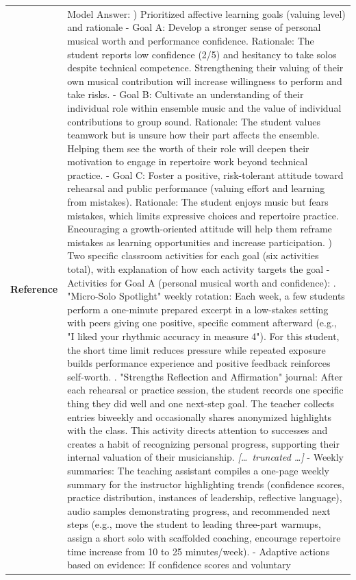 \begin{longtable}{@{}l p{13cm}@{}}
  \textbf{Reference} & Model Answer: \newline 1) Prioritized affective learning goals (valuing level) and rationale \newline - Goal A: Develop a stronger sense of personal musical worth and performance confidence. Rationale: The student reports low confidence (2/5) and hesitancy to take solos despite technical competence. Strengthening their valuing of their own musical contribution will increase willingness to perform and take risks. \newline - Goal B: Cultivate an understanding of their individual role within ensemble music and the value of individual contributions to group sound. Rationale: The student values teamwork but is unsure how their part affects the ensemble. Helping them see the worth of their role will deepen their motivation to engage in repertoire work beyond technical practice. \newline - Goal C: Foster a positive, risk-tolerant attitude toward rehearsal and public performance (valuing effort and learning from mistakes). Rationale: The student enjoys music but fears mistakes, which limits expressive choices and repertoire practice. Encouraging a growth-oriented attitude will help them reframe mistakes as learning opportunities and increase participation. \newline 2) Two specific classroom activities for each goal (six activities total), with explanation of how each activity targets the goal \newline - Activities for Goal A (personal musical worth and confidence): \newline 1. "Micro-Solo Spotlight" weekly rotation: Each week, a few students perform a one-minute prepared excerpt in a low-stakes setting with peers giving one positive, specific comment afterward (e.g., "I liked your rhythmic accuracy in measure 4"). For this student, the short time limit reduces pressure while repeated exposure builds performance experience and positive feedback reinforces self-worth. \newline 2. "Strengths Reflection and Affirmation" journal: After each rehearsal or practice session, the student records one specific thing they did well and one next-step goal. The teacher collects entries biweekly and occasionally shares anonymized highlights with the class. This activity directs attention to successes and creates a habit of recognizing personal progress, supporting their internal valuation of their musicianship. \newline \textit{[\ldots\ truncated \ldots]} \newline - Weekly summaries: The teaching assistant compiles a one-page weekly summary for the instructor highlighting trends (confidence scores, practice distribution, instances of leadership, reflective language), audio samples demonstrating progress, and recommended next steps (e.g., move the student to leading three-part warmups, assign a short solo with scaffolded coaching, encourage repertoire time increase from 10 to 25 minutes/week). \newline - Adaptive actions based on evidence: If confidence scores and voluntary 
\end{longtable}
